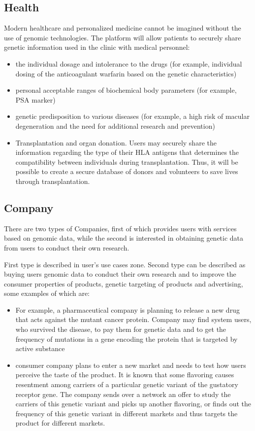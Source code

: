 \subsection{Health}
Modern healthcare and personalized medicine cannot be imagined without the use of genomic technologies. The platform will allow patients to securely share genetic information used in the clinic with medical personnel:
\begin{itemize}
\item the individual dosage and intolerance to the drugs (for example, individual dosing of the anticoagulant warfarin based on the genetic characteristics)
\item personal acceptable ranges of biochemical body parameters (for example, PSA marker)
\item genetic predisposition to various diseases (for example, a high risk of macular degeneration and the need for additional research and prevention)
\item Transplantation and organ donation. Users may securely share the information regarding the type of their HLA antigens that determines the compatibility between individuals during transplantation. Thus, it will be possible to create a secure database of donors and volunteers to save lives through transplantation.
\end{itemize}

\subsection{Company}
There are two types of Companies, first of which provides users with services based on genomic data, while the second is interested in obtaining genetic data from users to conduct their own research.

First type is described in user's use cases zone. Second type can be described as buying users genomic data to conduct their own research and to improve the consumer properties of products, genetic targeting of products and advertising, some examples of which are:
\begin{itemize}
  \item For example, a pharmaceutical company is planning to release a new drug that acts against the mutant cancer protein. Company may find system users, who survived the disease, to pay them for genetic data and to get the frequency of mutations in a gene encoding the protein that is targeted by active substance
  \item consumer company plans to enter a new market and needs to test how users perceive the taste of the product. It is known that some flavoring causes resentment among carriers of a particular genetic variant of the gustatory receptor gene. The company sends over a network an offer to study the carriers of this genetic variant and picks up another flavoring, or finds out the frequency of this genetic variant in different markets and thus targets the product for different markets.
 \end{itemize}

